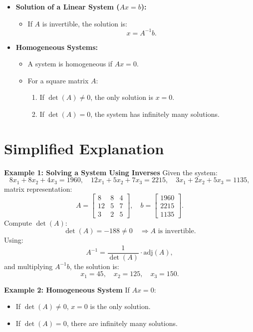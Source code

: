 \documentclass{article}
\begin{document}
\begin{itemize}
  \item \textbf{Solution of a Linear System ($Ax = b$):}
    \begin{itemize}
      \item If $A$ is invertible, the solution is:
        \[
          x = A^{-1}b.
        \]
    \end{itemize}

  \item \textbf{Homogeneous Systems:}
    \begin{itemize}
      \item A system is homogeneous if $Ax = 0$.
      \item For a square matrix $A$:
        \begin{enumerate}
          \item If $\det(A) \neq 0$, the only solution is $x = 0$.
          \item If $\det(A) = 0$, the system has infinitely many solutions.
        \end{enumerate}
    \end{itemize}
\end{itemize}

\section*{Simplified Explanation}

\textbf{Example 1: Solving a System Using Inverses}
Given the system:
\[
  8x_1 + 8x_2 + 4x_3 = 1960, \quad 12x_1 + 5x_2 + 7x_3 = 2215, \quad 3x_1 + 2x_2 + 5x_3 = 1135,
\]
matrix representation:
\[
  A =
  \begin{bmatrix}
    8 & 8 & 4 \\
    12 & 5 & 7 \\
    3 & 2 & 5
  \end{bmatrix},
  \quad
  b =
  \begin{bmatrix}
    1960 \\
    2215 \\
    1135
  \end{bmatrix}.
\]
Compute $\det(A)$:
\[
  \det(A) = -188 \neq 0 \quad \Rightarrow A \text{ is invertible}.
\]
Using:
\[
  A^{-1} = \frac{1}{\det(A)} \cdot \text{adj}(A),
\]
and multiplying $A^{-1}b$, the solution is:
\[
  x_1 = 45, \quad x_2 = 125, \quad x_3 = 150.
\]

\textbf{Example 2: Homogeneous System}
If $Ax = 0$:
\begin{itemize}
  \item If $\det(A) \neq 0$, $x = 0$ is the only solution.
  \item If $\det(A) = 0$, there are infinitely many solutions.
\end{itemize}
\end{document}
